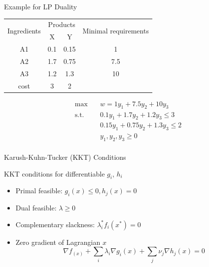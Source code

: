 \documentclass[12pt,notes,mathserif]{beamer}
\begin{document}
\begin{frame}
	{Example for LP Duality}
	\begin{table}
		\begin{tabular}{cccc}
			\hline
			\multirow{2}{*}{Ingredients} & \multicolumn{2}{c}{Products} & \multirow{2}{*}{Minimal requirements}       \\ \cline{2-3}
			                             & X                            & Y                                     &     \\  \hline \hline
			A1                           & 0.1                          & 0.15                                  & 1   \\
			A2                           & 1.7                          & 0.75                                  & 7.5 \\
			A3                           & 1.2                          & 1.3                                   & 10  \\ \hline
			cost                         & 3                            & 2                                     &     \\ \hline
		\end{tabular}
	\end{table}
	\begin{equation*}
		\begin{aligned}
			\max \quad          & w= 1 y_1 + 7.5y_2 +10 y_3          \\
			\textrm{s.t.} \quad & 0.1 y_1 + 1.7 y_2 + 1.2 y_3 \le 3  \\
			                    & 0.15y_1 + 0.75 y_2 + 1.3 y_3 \le 2 \\
			                    & y_1,y_2,y_3 \ge 0                  \\
		\end{aligned}
	\end{equation*}
\end{frame}



\begin{frame}
	{Karush-Kuhn-Tucker (KKT) Conditions}

	\begin{block}{KKT conditions for differentiable $g_i$, $h_i$}
		\begin{itemize}
			\item Primal feasible: $g_i(x) \le 0, h_j(x) =0$
			\item Dual feasible: $\lambda \ge 0$
			\item Complementary slackness: $\lambda_i^* f_i(x^*) =0$
			\item Zero gradient of Lagrangian \wrt $x$
			      \[\nabla f_(x) + \sum_{i} \lambda_i \nabla g_i(x) + \sum_{j} \nu_j \nabla h_j(x) =0 \]
		\end{itemize}
	\end{block}

\end{frame}
\end{document}
